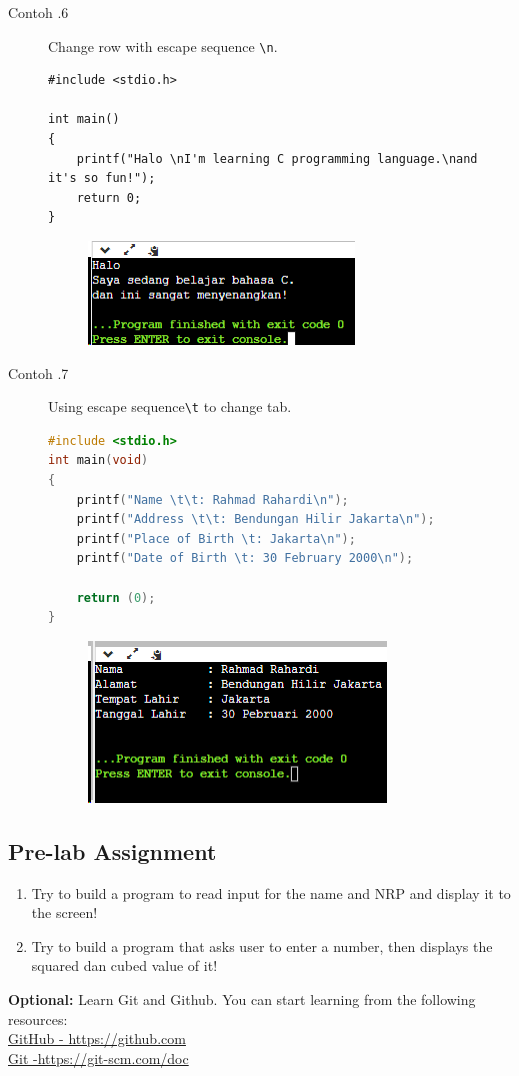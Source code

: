 \begin{description}
	\item[Contoh \thesubsection.6] Change row with escape sequence \verb*|\n|.
		\begin{lstlisting}
#include <stdio.h>

int main() 
{
	printf("Halo \nI'm learning C programming language.\nand it's so fun!");
	return 0;
}
	\end{lstlisting}
		\begin{figure}[H]
			\centering
			\includegraphics[width=0.5\linewidth]{P1/img/screenshot0006.png}
			\caption{}
			\label{fig:screenshot0006}
		\end{figure}

	\item[Contoh \thesubsection.7] Using escape sequence\verb*|\t| to change tab.
		\begin{lstlisting}[language=c]
#include <stdio.h>
int main(void)
{
	printf("Name \t\t: Rahmad Rahardi\n");
	printf("Address \t\t: Bendungan Hilir Jakarta\n");
	printf("Place of Birth \t: Jakarta\n");
	printf("Date of Birth \t: 30 February 2000\n");
	
	return (0);
}
\end{lstlisting}
		\begin{figure}[H]
			\centering
			\includegraphics[width=0.5\linewidth]{P1/img/screenshot0007.png}
			\caption{}
			\label{fig:screenshot0007}
		\end{figure}
\end{description}

\subsection{Pre-lab Assignment}
\begin{enumerate}
	\item Try to build a program to read input for the name and NRP and display it to the screen!
	\item Try to build a program that asks user to enter a number, then displays the squared dan cubed value of it!
\end{enumerate}

\begin{center}
	\colorbox{cyan!30}{\parbox{0.8\linewidth}{\textbf{Optional:} Learn Git and Github. You can start learning from the following resources: \\ \href{https://github.com}{GitHub - https://github.com} \\ \href{https://git-scm.com/doc}{Git -https://git-scm.com/doc}}}
\end{center}